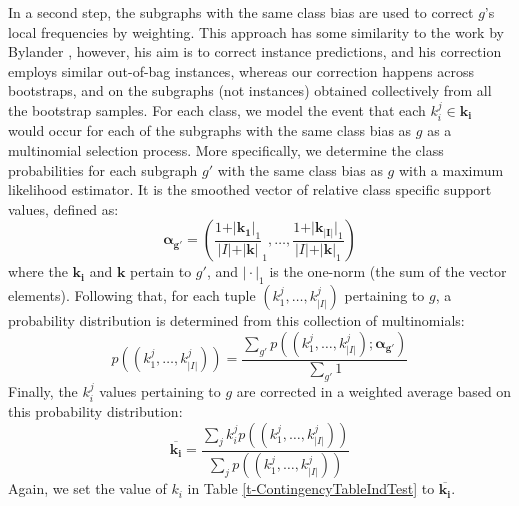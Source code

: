 \documentclass{article}
\begin{document}
In a second step, the subgraphs with the same class bias are used to correct
$g$'s local frequencies by weighting. This approach has some similarity to the
work by Bylander \cite{bylander02estimating}, however, his aim is to correct
instance predictions, and his correction employs similar out-of-bag instances,
whereas our correction happens across bootstraps, and on the subgraphs (not
instances) obtained collectively from all the bootstrap samples.  For each
class, we model the event that each $k_i^j \in \mathbf{k_i}$ would occur for
each of the subgraphs with the same class bias as $g$ as a multinomial
selection process.  More specifically, we determine the class probabilities for
each subgraph $g'$ with the same class bias as $g$ with a maximum likelihood
estimator. It is the smoothed vector of relative class specific support values,
defined as:
\begin{equation}
  \mathbf{\alpha_{g'}} = \left(\frac{1+\vert\mathbf{k_1}\vert_1}{\vert I\vert+\vert\mathbf{k}\vert}_1,\ldots,\frac{1+\vert\mathbf{k_{\vert I\vert}}\vert_1}{\vert I\vert+\vert\mathbf{k}\vert_1}\right)
  \label{eqn:mlexpr}
\end{equation}
where the $\mathbf{k_i}$ and $\mathbf{k}$ pertain to $g'$, and $\vert\cdot\vert_1$ is the one-norm (the sum of the vector elements). Following that, for
each tuple $(k_1^j,\ldots,k_{\vert I\vert}^j)$ pertaining to $g$, a probability distribution is
determined from this collection of multinomials:
\begin{equation}
  p((k_1^j,\ldots,k_{\vert I\vert}^j))=\frac{\sum_{g'} p((k_1^j,\ldots,k_{\vert I\vert}^j); \mathbf{\alpha_{g'}})}{\sum_{g'}1}
  \label{eqn:avgpr}
\end{equation}
Finally, the $k_i^j$ values pertaining to $g$ are corrected in a weighted average
based on this probability distribution:
\begin{equation}
  \overline{\mathbf{k_i}}=\frac{\sum_j k_i^j p((k_1^j,\ldots,k_{\vert I\vert}^j))}{\sum_j p((k_1^j,\ldots,k_{\vert I\vert}^j))}
  \label{eqn:avgki}
\end{equation}
Again, we set the value of $k_i$ in Table \ref{t-ContingencyTableIndTest} to $\overline{\mathbf{k_i}}$.
\end{document}
